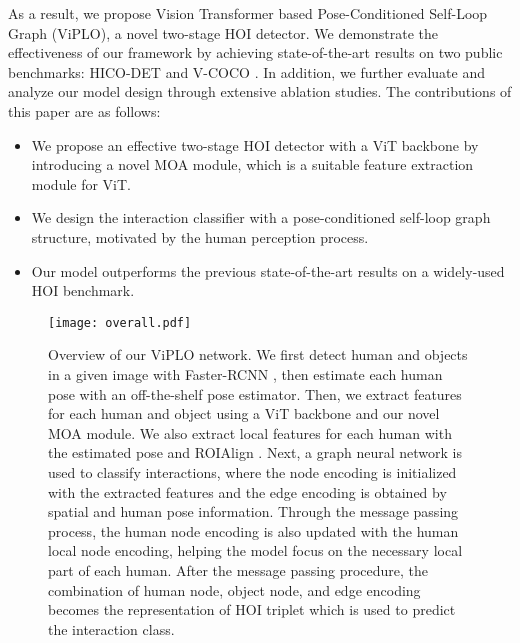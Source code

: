 \documentclass[10pt,twocolumn,letterpaper]{article}
\begin{document}
As a result, we propose Vision Transformer based Pose-Conditioned Self-Loop Graph (ViPLO), a novel two-stage HOI detector. We demonstrate the effectiveness of our framework by achieving state-of-the-art results on two public benchmarks: HICO-DET \cite{chao:wacv2018} and V-COCO \cite{gupta2015visual}. In addition, we further evaluate and analyze our model design through extensive ablation studies. The contributions of this paper are as follows: 




\begin{itemize}
    \item {We propose an effective two-stage HOI detector with a ViT backbone by introducing a novel MOA module, which is a suitable feature extraction module for ViT.}
    
    \item {We design the interaction classifier with a pose-conditioned self-loop graph structure, motivated by the human perception process.}
    
    \item {Our model outperforms the previous state-of-the-art results on a widely-used HOI benchmark.}
\end{itemize}
 
 


\begin{figure*}[t]
\begin{center}

\texttt{[image: overall.pdf]}

\end{center}
\vspace{-5mm}
   \caption{Overview of our ViPLO network. We first detect human and objects in a given image with Faster-RCNN \cite{ren2015faster}, then estimate each human pose with an off-the-shelf pose estimator. Then, we extract features for each human and object using a ViT backbone and our novel MOA module. We also extract local features for each human with the estimated pose and ROIAlign \cite{he2017mask}. Next, a graph neural network is used to classify interactions, where the node encoding is initialized with the extracted features and the edge encoding is obtained by spatial and human pose information. Through the message passing process, the human node encoding is also updated with the human local node encoding, helping the model focus on the necessary local part of each human. After the message passing procedure, the combination of human node, object node, and edge encoding becomes the representation of HOI triplet which is used to predict the interaction class.  
}
\vspace{-1mm}
\label{fig:overall}
\end{figure*} 
\end{document}
